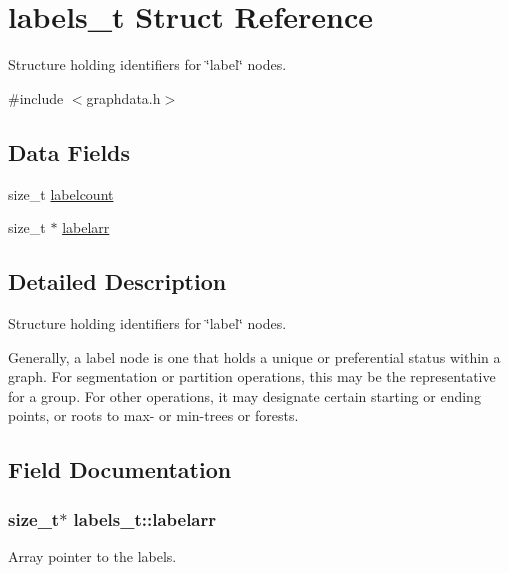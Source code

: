\hypertarget{structlabels__t}{}\section{labels\+\_\+t Struct Reference}
\label{structlabels__t}


Structure holding identifiers for \char`\"{}label\char`\"{} nodes.  




{\ttfamily \#include $<$graphdata.\+h$>$}

\subsection*{Data Fields}
\begin{DoxyCompactItemize}
\item 
size\+\_\+t \hyperlink{structlabels__t_af5b7ba7df24db052d4eb4d762a027039}{labelcount}
\item 
size\+\_\+t $\ast$ \hyperlink{structlabels__t_a629db8e17b21047f88e4f7e484522593}{labelarr}
\end{DoxyCompactItemize}


\subsection{Detailed Description}
Structure holding identifiers for \char`\"{}label\char`\"{} nodes. 

Generally, a label node is one that holds a unique or preferential status within a graph. For segmentation or partition operations, this may be the representative for a group. For other operations, it may designate certain starting or ending points, or roots to max-\/ or min-\/trees or forests. 

\subsection{Field Documentation}
\subsubsection[{\texorpdfstring{labelarr}{labelarr}}]{\setlength{\rightskip}{0pt plus 5cm}size\+\_\+t$\ast$ labels\+\_\+t\+::labelarr}\hypertarget{structlabels__t_a629db8e17b21047f88e4f7e484522593}{}\label{structlabels__t_a629db8e17b21047f88e4f7e484522593}
Array pointer to the labels. 
